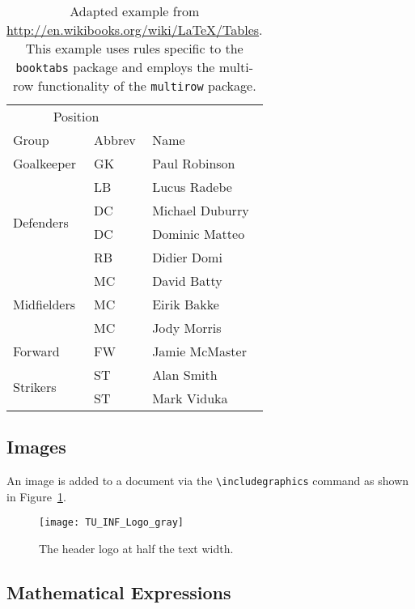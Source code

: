 \begin{table}[h] %
  \centering
	\begin{tabular}{lll}
	\toprule
	\multicolumn{2}{c}{Position} \\
	\cmidrule{1-2} %
	Group & Abbrev & Name \\
	\midrule
	Goalkeeper & GK & Paul Robinson \\
	\midrule
	\multirow{4}{*}{Defenders} & LB & Lucus Radebe \\
	                           & DC & Michael Duburry \\
	                           & DC & Dominic Matteo \\
	                           & RB & Didier Domi \\
	\midrule
	\multirow{3}{*}{Midfielders} & MC & David Batty \\
	                             & MC & Eirik Bakke \\
	                             & MC & Jody Morris \\
  \midrule
	Forward & FW & Jamie McMaster \\
	\midrule
	\multirow{2}{*}{Strikers} & ST & Alan Smith \\
	                          & ST & Mark Viduka \\
	\bottomrule
	\end{tabular}
	\caption{Adapted example from \url{http://en.wikibooks.org/wiki/LaTeX/Tables}. This example uses rules specific to the \texttt{booktabs} package and employs the multi-row functionality of the \texttt{multirow} package.}
	\label{tab:intro} %
\end{table}

\subsection{Images}

An image is added to a document via the \verb|\includegraphics| command as shown in Figure~\ref{fig:intro}.

\begin{figure}[h]
  \centering
  \texttt{[image: TU\_INF\_Logo\_gray]}
  \caption{The header logo at half the text width.}
  \label{fig:intro} %
\end{figure}

\subsection{Mathematical Expressions}

